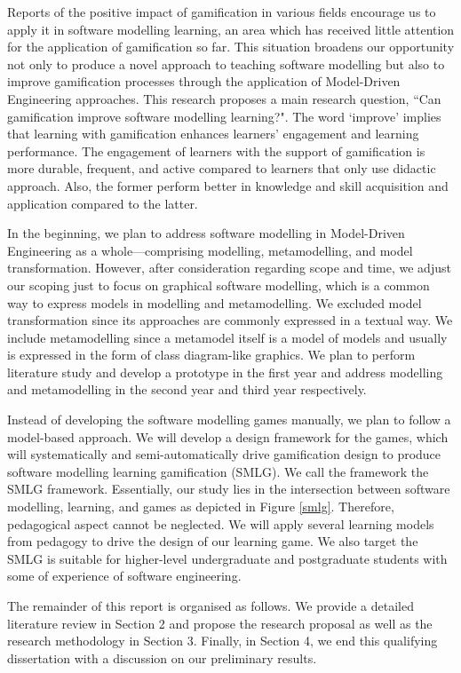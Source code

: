 \documentclass[12pt, a4paper]{report}
\begin{document}
Reports of the positive impact of gamification in various fields encourage us to apply it in software modelling learning, an area which has received little attention for the application of gamification so far. This situation broadens our opportunity not only to produce a novel approach to teaching software modelling but also to improve gamification processes through the application of Model-Driven Engineering approaches. This research proposes a main research question, ``Can gamification improve software modelling learning?". The word `improve' implies that learning with gamification enhances learners' engagement and learning performance. The engagement of learners with the support of gamification is more durable, frequent, and active compared to learners that only use didactic approach. Also, the former perform better in knowledge and skill acquisition and application compared to the latter.   

In the beginning, we plan to address software modelling in Model-Driven Engineering as a whole---comprising modelling, metamodelling, and model transformation. However, after consideration regarding scope and time, we adjust our scoping just to focus on graphical software modelling, which is a common way to express models in modelling and metamodelling. We excluded model transformation since its approaches are commonly expressed in a textual way. We include metamodelling since a metamodel itself is a model of models and usually is expressed in the form of class diagram-like graphics. We plan to perform literature study and develop a prototype in the first year and address modelling and metamodelling in the second year and third year respectively. 
    
Instead of developing the software modelling games manually, we plan to follow a model-based approach. We will develop a design framework for the games, which will systematically and semi-automatically drive gamification design to produce software modelling learning gamification (SMLG). We call the framework the SMLG framework. Essentially, our study lies in the intersection between software modelling, learning, and games as depicted in Figure \ref{smlg}. Therefore, pedagogical aspect cannot be neglected. We will apply several learning models from pedagogy to drive the design of our learning game. We also target the SMLG is suitable for higher-level undergraduate and postgraduate students with some of experience of software engineering. 

The remainder of this report is organised as follows. We provide a detailed literature review in Section 2 and propose the research proposal as well as the research methodology in Section 3. Finally, in Section 4, we end this qualifying dissertation with a discussion on our preliminary results. 
\end{document}
